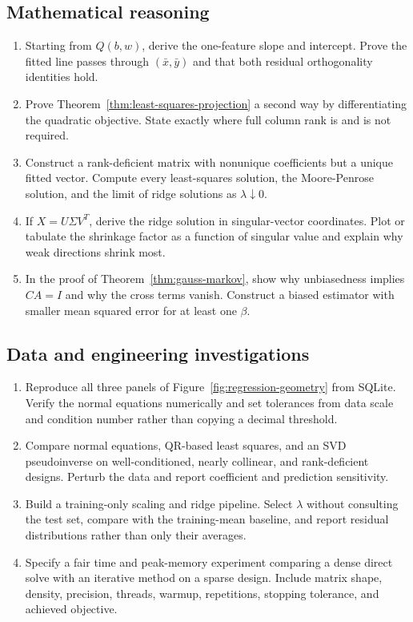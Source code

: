 \subsection*{Mathematical reasoning}

\begin{enumerate}[label=\textbf{LR-M\arabic*.},leftmargin=*,itemsep=0.65em]
  \item Starting from $Q(b,w)$, derive the one-feature slope and intercept.
  Prove the fitted line passes through $(\bar x,\bar y)$ and that both residual
  orthogonality identities hold.
  \item Prove Theorem~\ref{thm:least-squares-projection} a second way by
  differentiating the quadratic objective. State exactly where full column rank
  is and is not required.
  \item Construct a rank-deficient matrix with nonunique coefficients but a
  unique fitted vector. Compute every least-squares solution, the Moore-Penrose
  solution, and the limit of ridge solutions as $\lambda\downarrow0$.
  \item If $X=U\Sigma V^T$, derive the ridge solution in singular-vector
  coordinates. Plot or tabulate the shrinkage factor as a function of singular
  value and explain why weak directions shrink most.
  \item In the proof of Theorem~\ref{thm:gauss-markov}, show why unbiasedness
  implies $CA=I$ and why the cross terms vanish. Construct a biased estimator
  with smaller mean squared error for at least one $\beta$.
\end{enumerate}

\subsection*{Data and engineering investigations}

\begin{enumerate}[label=\textbf{LR-C\arabic*.},leftmargin=*,itemsep=0.65em]
  \item Reproduce all three panels of Figure~\ref{fig:regression-geometry} from
  SQLite. Verify the normal equations numerically and set tolerances from data
  scale and condition number rather than copying a decimal threshold.
  \item Compare normal equations, QR-based least squares, and an SVD
  pseudoinverse on well-conditioned, nearly collinear, and rank-deficient
  designs. Perturb the data and report coefficient and prediction sensitivity.
  \item Build a training-only scaling and ridge pipeline. Select $\lambda$
  without consulting the test set, compare with the training-mean baseline,
  and report residual distributions rather than only their averages.
  \item Specify a fair time and peak-memory experiment comparing a dense direct
  solve with an iterative method on a sparse design. Include matrix shape,
  density, precision, threads, warmup, repetitions, stopping tolerance, and
  achieved objective.
\end{enumerate}

